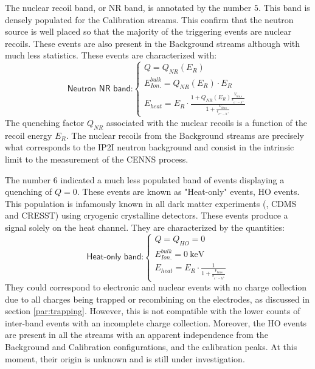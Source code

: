 The nuclear recoil band, or NR band, is annotated by the number $5$. This band is densely populated for the Calibration streams. This confirm that the neutron source is well placed so that the majority of the triggering events are nuclear recoils. These events are also present in the Background streams although with much less statistics. These events are characterized with:
\begin{equation}
\label{eq:nr-band}
\textsf{Neutron NR band:}
\begin{cases}
Q = Q_{NR} \left( E_R \right) \\
E_{Ion.}^{bulk} = Q_{NR}\left( E_R \right) \cdot E_R \\
E_{heat} 
=
E_R 
\cdot
\frac{
1 + Q_{NR} \left( E_R \right)\frac{V_{bias}}{\epsilon_{e^--h^+}}
}{
1 + \frac{V_{bias}}{\epsilon_{e^--h^+}}
}
\end{cases}
\end{equation}
The quenching factor $Q_{NR}$ associated with the nuclear recoils is a function of the recoil energy $E_R$.
The nuclear recoils from the Background streams are precisely what corresponds to the IP2I neutron background and consist in the intrinsic limit to the measurement of the CENNS process.

The number $6$ indicated a much less populated band of events displaying a quenching of $Q=0$. These events are known as "Heat-only" events, HO events. This population is infamously known in all dark matter experiments (\Edelweiss{}, CDMS and CRESST) using cryogenic crystalline detectors. These events produce a signal solely on the heat channel. They are characterized by the quantities:
\begin{equation}
\label{eq:ho-band}
\textsf{Heat-only band:}
\begin{cases}
Q = Q_{HO} = 0 \\
E_{Ion.}^{bulk} = \SI{0}{\kilo\eV}\\
E_{heat} 
=
E_R 
\cdot
\frac{
1
}{
1 + \frac{V_{bias}}{\epsilon_{e^--h^+}}
}
\end{cases}
\end{equation}
They could correspond to electronic and nuclear events with no charge collection due to all charges being trapped or recombining on the electrodes, as discussed in section \ref{par:trapping}. However, this is not compatible with the lower counts of inter-band events with an incomplete charge collection. Moreover, the HO events are present in all the streams with an apparent independence from the Background and Calibration configurations, and the calibration peaks.
At this moment, their origin is unknown and is still under investigation.

